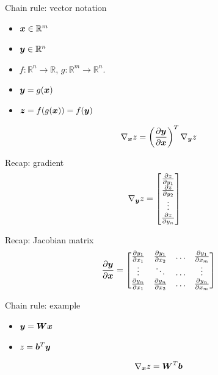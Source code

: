 \documentclass[10pt]{beamer}
\begin{document}
\begin{frame}{Chain rule: vector notation}

\Large{
\begin{itemize}
\item $\bm{x} \in \mathbb{R}^{m}$
\item $\bm{y} \in \mathbb{R}^{n}$
\item $f:\mathbb{R}^{n} \rightarrow\mathbb{R}$, $g:\mathbb{R}^{m} \rightarrow\mathbb{R}^{n}$. 
\item $\bm{y} = g(\bm{x})$
\item $\bm{z} = f(g(\bm{x})) = f(\bm{y})$
\end{itemize}
\[
\nabla_{\bm{x}} {z} = \left(\frac{\partial \bm{y}}{\partial \bm{x}}\right)^{T}\nabla_{\bm{y}} {z}
\]
}
\end{frame}

\begin{frame}{Recap: gradient}
\Large{
\begin{align*}
  \nabla_{\bm{y}} {z} &= \begin{bmatrix}
                         \frac{\partial z}{\partial y_{1}} \\
                         \frac{\partial z}{\partial y_{2}} \\
                         \vdots \\
                         \frac{\partial z}{\partial y_{n}}
                         \end{bmatrix}
\end{align*}
 }
\end{frame}

\begin{frame}{Recap: Jacobian matrix}
\Large{
\[
\frac{\partial \bm{y}}{\partial \bm{x}} =
\begin{bmatrix} 

\frac{\partial y_{1}}{\partial x_{1}} & \frac{\partial y_{1}}{\partial x_{2}} & \dots & \frac{\partial y_{1}}{\partial x_{m}} \\

\vdots & \ddots &\dots & \vdots \\

\frac{\partial y_{n}}{\partial x_{1}} &\frac{\partial y_{n}}{\partial x_{2}} & \dots&\frac{\partial y_{n}}{\partial x_{m}} 

\end{bmatrix}
\]
 }
\end{frame}

\begin{frame}{Chain rule: example}
\Large{
\begin{itemize}
\item $\bm{y} = \bm{W}\bm{x}$
\vspace{0.2cm}
\item $z = \bm{b}^{T}\bm{y}$
\end{itemize}
\vspace{0.2cm}
\[
\nabla_{\bm{x}} {z} =  \bm{W}^{T}\bm{b}
\]
}
\end{frame}
\end{document}
